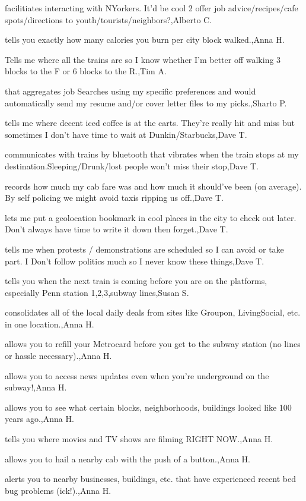 \documentclass{article}
\begin{document}
facilitiates interacting with NYorkers. It'd be cool 2 offer job advice/recipes/cafe spots/directions to youth/tourists/neighbors?,Alberto C.

tells you exactly how many calories you burn per city block walked.,Anna H.

Tells me where all the trains are so I know whether I'm better off walking 3 blocks to the F or 6 blocks to the R.,Tim A.

that aggregates job Searches using my specific preferences and would automatically send my resume and/or cover letter files to my picks.,Sharto P.

 tells me where decent iced coffee is at the carts.  They're really hit and miss but sometimes I don't have time to wait at Dunkin/Starbucks,Dave T.

communicates with trains by bluetooth that vibrates when the train stops at my destination.Sleeping/Drunk/lost people won't miss their stop,Dave T.

records how much my cab fare was and how much it should've been (on average). By self policing we might avoid taxis ripping us off.,Dave T.

lets me put a geolocation bookmark in cool places in the city to check out later. Don't always have time to write it down then forget.,Dave T.

tells me when protests / demonstrations are scheduled so I can avoid or take part. I Don't follow politics much so I never know these things,Dave T.

tells you when the next train is coming before you are on the platforms, especially Penn station 1,2,3,subway lines,Susan S.

consolidates all of the local daily deals from sites like Groupon, LivingSocial, etc. in one location.,Anna H.

allows you to refill your Metrocard before you get to the subway station (no lines or hassle necessary).,Anna H.

allows you to access news updates even when you're underground on the subway!,Anna H.

allows you to see what certain blocks, neighborhoods, buildings looked like 100 years ago.,Anna H.

tells you where movies and TV shows are filming RIGHT NOW.,Anna H.

allows you to hail a nearby cab with the push of a button.,Anna H.

alerts you to nearby businesses, buildings, etc. that have experienced recent bed bug problems (ick!).,Anna H.
\end{document}
